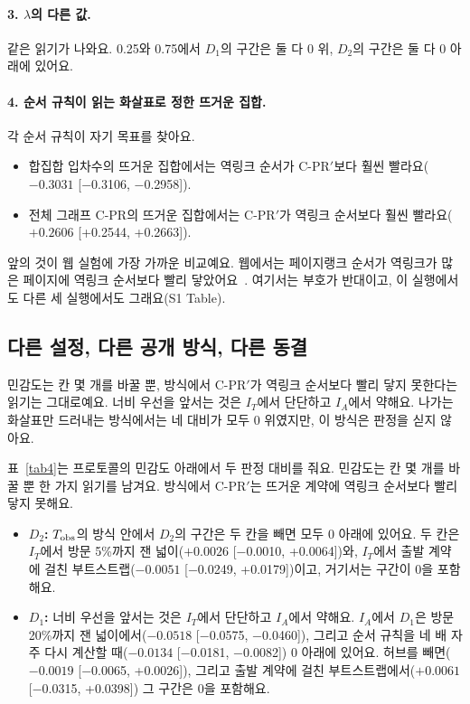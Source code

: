 \paragraph{3. $\lambda$의 다른 값.}
같은 읽기가 나와요. 0.25와 0.75에서 $D_1$의 구간은 둘 다 0 위, $D_2$의 구간은 둘 다 0 아래에 있어요.

\paragraph{4. 순서 규칙이 읽는 화살표로 정한 뜨거운 집합.}
각 순서 규칙이 자기 목표를 찾아요.
\begin{itemize}
\item 합집합 입차수의 뜨거운 집합에서는 역링크 순서가 C-PR$'$보다 훨씬 빨라요($-0.3031$ [−0.3106, −0.2958]).
\item 전체 그래프 C-PR의 뜨거운 집합에서는 C-PR$'$가 역링크 순서보다 훨씬 빨라요($+0.2606$ [+0.2544, +0.2663]).
\end{itemize}
앞의 것이 웹 실험에 가장 가까운 비교예요. 웹에서는 페이지랭크 순서가 역링크가 많은 페이지에 역링크 순서보다 빨리 닿았어요~\cite{cho1998crawling}. 여기서는 부호가 반대이고, 이 실행에서도 다른 세 실행에서도 그래요(S1 Table).

\subsection{다른 설정, 다른 공개 방식, 다른 동결}

\begin{yoji}
민감도는 칸 몇 개를 바꿀 뿐, \both{} 방식에서 C-PR$'$가 역링크 순서보다 빨리 닿지 못한다는 읽기는 그대로예요. 너비 우선을 앞서는 것은 $I_T$에서 단단하고 $I_A$에서 약해요. 나가는 화살표만 드러내는 \outm{} 방식에서는 네 대비가 모두 0 위였지만, 이 방식은 판정을 싣지 않아요.
\end{yoji}

표~\ref{tab4}는 프로토콜의 민감도 아래에서 두 판정 대비를 줘요. 민감도는 칸 몇 개를 바꿀 뿐 한 가지 읽기를 남겨요. \both{} 방식에서 C-PR$'$는 뜨거운 계약에 역링크 순서보다 빨리 닿지 못해요.
\begin{itemize}
\item \textbf{$D_2$:} $T_{\mathrm{obs}}$의 \both{} 방식 안에서 $D_2$의 구간은 두 칸을 빼면 모두 0 아래에 있어요. 두 칸은 $I_T$에서 방문 5\%까지 잰 넓이($+0.0026$ [−0.0010, +0.0064])와, $I_T$에서 출발 계약에 걸친 부트스트랩($-0.0051$ [−0.0249, +0.0179])이고, 거기서는 구간이 0을 포함해요.
\item \textbf{$D_1$:} 너비 우선을 앞서는 것은 $I_T$에서 단단하고 $I_A$에서 약해요. $I_A$에서 $D_1$은 방문 20\%까지 잰 넓이에서($-0.0518$ [−0.0575, −0.0460]), 그리고 순서 규칙을 네 배 자주 다시 계산할 때($-0.0134$ [−0.0181, −0.0082]) 0 아래에 있어요. 허브를 빼면($-0.0019$ [−0.0065, +0.0026]), 그리고 출발 계약에 걸친 부트스트랩에서($+0.0061$ [−0.0315, +0.0398]) 그 구간은 0을 포함해요.
\end{itemize}

